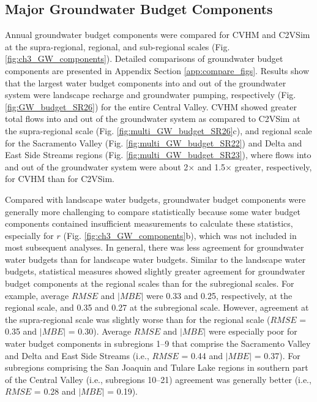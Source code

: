 \subsection{Major Groundwater Budget Components}

Annual groundwater budget components were compared for CVHM and C2VSim at the supra-regional, regional, and sub-regional scales (Fig. \ref{fig:ch3_GW_components}). Detailed comparisons of groundwater budget components are presented in Appendix Section \ref{app:compare_figs}. Results show that the largest water budget components into and out of the groundwater system were landscape recharge and groundwater pumping, respectively (Fig. \ref{fig:GW_budget_SR26}) for the entire Central Valley. CVHM showed greater total flows into and out of the groundwater system as compared to C2VSim at the supra-regional scale (Fig. \ref{fig:multi_GW_budget_SR26}c), and regional scale for the Sacramento Valley (Fig. \ref{fig:multi_GW_budget_SR22}) and Delta and East Side Streams regions (Fig. \ref{fig:multi_GW_budget_SR23}), where flows into and out of the groundwater system were about 2$\times$ and 1.5$\times$ greater, respectively, for CVHM than for C2VSim.

Compared with landscape water budgets, groundwater budget components were generally more challenging to compare statistically because some water budget components contained insufficient measurements to calculate these statistics, especially for $r$ (Fig. \ref{fig:ch3_GW_components}b), which was not included in most subsequent analyses. In general, there was less agreement for groundwater water budgets than for landscape water budgets. Similar to the landscape water budgets, statistical measures showed slightly greater agreement for groundwater budget components at the regional scales than for the subregional scales. For example, average $RMSE$ and $|MBE|$ were 0.33 and 0.25, respectively, at the regional scale, and 0.35 and 0.27 at the subregional scale. However, agreement at the supra-regional scale was slightly worse than for the regional scale ($RMSE$ = 0.35 and $|MBE|$ = 0.30). Average $RMSE$ and $|MBE|$ were especially poor for water budget components in subregions 1--9 that comprise the Sacramento Valley and Delta and East Side Streams (i.e., $RMSE$ = 0.44 and $|MBE|$ = 0.37). For subregions comprising the San Joaquin and Tulare Lake regions in southern part of the Central Valley  (i.e., subregions 10--21) agreement was generally better (i.e., $RMSE$ = 0.28 and $|MBE|$ = 0.19). 

